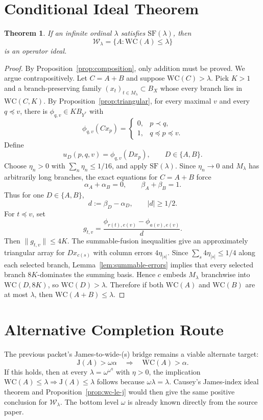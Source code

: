 \documentclass[11pt]{article}
\newtheorem{theorem}{Theorem}[section]
\theoremstyle{definition}
\theoremstyle{remark}
\newcommand{\WC}{\mathrm{WC}}
\newcommand{\J}{\mathrm{J}}
\newcommand{\cW}{\mathcal W}
\begin{document}
\section{Conditional Ideal Theorem}

\begin{theorem}\label{thm:SF}
If an infinite ordinal \(\lambda\) satisfies \(\mathrm{SF}(\lambda)\), then
\[
   \cW_\lambda=\{A:\WC(A)\leq\lambda\}
\]
is an operator ideal.
\end{theorem}

\begin{proof}
By Proposition~\ref{prop:composition}, only addition must be proved.  We
argue contrapositively.  Let \(C=A+B\) and suppose \(\WC(C)>\lambda\).  Pick
\(K>1\) and a branch-preserving family \((x_t)_{t\in M_\lambda}\subset B_X\)
whose every branch lies in \(\WC(C,K)\).  By
Proposition~\ref{prop:triangular}, for every maximal \(v\) and every
\(q\preceq v\), there is \(\phi_{q,v}\in K B_{Y^*}\) with
\[
 \phi_{q,v}(Cx_p)=
 \begin{cases}
 0,&p\prec q,\\
 1,&q\preceq p\preceq v.
 \end{cases}
\]
Define
\[
u_D(p,q,v)=\phi_{q,v}(Dx_p),\qquad D\in\{A,B\}.
\]
Choose \(\eta_n>0\) with \(\sum_n\eta_n\leq1/16\), and apply
\(\mathrm{SF}(\lambda)\).  Since \(\eta_n\to0\) and \(M_\lambda\) has
arbitrarily long branches, the exact equations for \(C=A+B\) force
\[
   \alpha_A+\alpha_B=0,\qquad \beta_A+\beta_B=1.
\]
Thus for one \(D\in\{A,B\}\),
\[
   d:=\beta_D-\alpha_D,\qquad |d|\geq1/2.
\]
For \(t\preceq v\), set
\[
   g_{t,v}=\frac{\phi_{r(t),e(v)}-\phi_{a(v),e(v)}}{d}.
\]
Then \(\|g_{t,v}\|\leq4K\).  The summable-fusion inequalities give an
approximately triangular array for \(Dx_{c(s)}\) with column errors
\(4\eta_{|s|}\).  Since \(\sum_s4\eta_{|s|}\leq1/4\) along each selected
branch, Lemma~\ref{lem:summable-errors} implies that every selected branch
\(8K\)-dominates the summing basis.  Hence \(c\) embeds \(M_\lambda\)
branchwise into \(\WC(D,8K)\), so \(\WC(D)>\lambda\).  Therefore if both
\(\WC(A)\) and \(\WC(B)\) are at most \(\lambda\), then
\(\WC(A+B)\leq\lambda\).
\end{proof}

\section{Alternative Completion Route}

The previous packet's James-to-wide-(s) bridge remains a viable alternate
target:
\[
   \J(A)>\omega\alpha
   \quad\Longrightarrow\quad
   \WC(A)>\alpha.
\]
If this holds, then at every \(\lambda=\omega^{\omega^\eta}\) with
\(\eta>0\), the implication \(\WC(A)\leq\lambda\Rightarrow\J(A)\leq\lambda\)
follows because \(\omega\lambda=\lambda\).  Causey's James-index ideal
theorem and Proposition~\ref{prop:wc-le-j} would then give the same positive
conclusion for \(\cW_\lambda\).  The bottom level \(\omega\) is already known
directly from the source paper.
\end{document}

